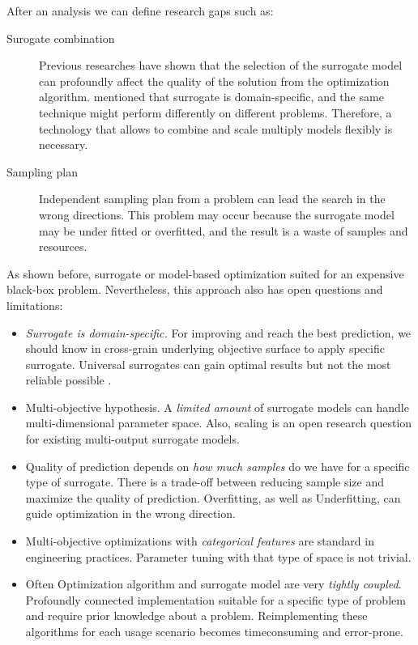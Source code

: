         After an analysis we can define research gaps such as:
        \begin{description}
            \item[Surogate combination] Previous researches have shown that the selection of the surrogate model can profoundly affect the quality of the solution from the optimization algorithm. \cite{LuST19} mentioned that surrogate is domain-specific, and the same technique might perform differently on different problems. Therefore, a technology that allows to combine and scale multiply models flexibly is necessary.
            \item[Sampling plan] Independent sampling plan from a problem can lead the search in the wrong directions. This problem may occur because the surrogate model may be under fitted or overfitted, and the result is a waste of samples and resources.
        \end{description}

        As shown before, surrogate or model-based optimization suited for an expensive black-box problem. Nevertheless, this approach also has open questions and limitations:
        \begin{itemize}
            \item \emph{Surrogate is domain-specific.} For improving and reach the best prediction, we should know in cross-grain underlying objective surface to apply specific surrogate. Universal surrogates can gain optimal results but not the most reliable possible \cite{abs181207958, LuST19}.
            \item Multi-objective hypothesis. A \emph{limited amount} of surrogate models can handle multi-dimensional parameter space. Also, scaling is an open research question for existing multi-output surrogate models.
            \item Quality of prediction depends on \emph{how much samples} do we have for a specific type of surrogate. There is a trade-off between reducing sample size and maximize the quality of prediction. Overfitting, as well as Underfitting, can guide optimization in the wrong direction.
            \item Multi-objective optimizations with \emph{categorical features} are standard in engineering practices. Parameter tuning with that type of space is not trivial.
            \item Often Optimization algorithm and surrogate model are very \emph{tightly coupled}. Profoundly connected implementation suitable for a specific type of problem and require prior knowledge about a problem. Reimplementing these algorithms for each usage scenario becomes timeconsuming and error-prone. 
        \end{itemize}



